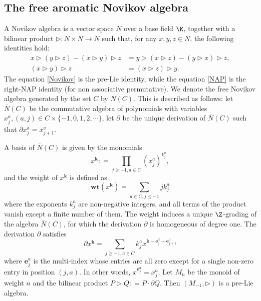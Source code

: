 \documentclass[a4paper,11pt]{article}
\begin{document}
\subsection{The free aromatic Novikov algebra}
\label{subsec:free_aromatic_Novikov_algebra}

A Novikov algebra is a vector space $N$ over a base field $\K$,  together with a bilinear product $\rhd: N\times N\rightarrow N$ such that, for any $x,y,z\in N$, the following identities hold:
\begin{align}
x\rhd (y\rhd z) - (x\rhd y)\rhd z & =y\rhd (x\rhd z) - (y \rhd x)\rhd z, \label{Novikov}\\
(x\rhd y)\rhd z & =(x\rhd z)\rhd y.\label{NAP}
\end{align}
The equation \eqref{Novikov} is the pre-Lie identity, while the equation \eqref{NAP}  is the right-NAP identity (for non associative permutative). We denote the free Novikov algebra generated by the set $C$ by $N(C)$.
This is described as follows: let $\overline{N}(C)$ be the commutative algebra of polynomials with variables $x_{j}^a, (a,j)\in C\times \{-1, 0, 1, 2, \cdots\}$, let $\partial$ be the unique derivation of $\overline{N}(C)$ such that $\partial x_j^a= x_{j+1}^a$.

A basis of $\overline{N}(C)$ is given by the monomials 
\[x^{\mathbf k}\colon= \prod_{j\geq -1, a\in C}(x_j^a)^{k_j^a},\]
and the weight of $x^{\mathbf k}$ is defined as
\[\mathbf {wt}(x^{\mathbf k})=\sum_{a\in C, j\leq -1 } j k_{j}^{a}\]
where the exponents $k_j^a$ are non-negative integers, and all terms of the product vanish except a finite number of them. The weight induces a unique $\Z$-grading of the algebra $\overline{N}(C)$, for which the derivation $\partial$ is homogeneous of degree one. The derivation $\partial$ satisfies
\begin{equation}\label{partialderivation}
    \partial x^{\mathbf k}=\sum_{j\geq -1, a\in C}k_j^ax^{\mathbf k - \mathbf e_j^a + \mathbf e_{j+1}^a}
\end{equation}
where $\mathbf e_j^a$ is the multi-index whose entries are all zero except for a single non-zero entry in position $(j,a)$. In other words, $x^{\mathbf e_j^a}=x_j^a$. Let $M_n$ be the monoid of weight $n$ and the bilinear product $P\rhd Q\colon=P\cdot\partial Q$. Then $(M_{-1},\rhd)$ is a pre-Lie algebra.
\end{document}
